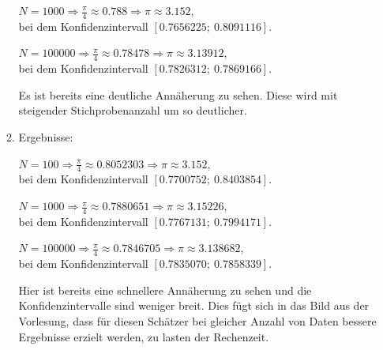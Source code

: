 \documentclass[a4paper]{scrartcl}
\def \blattnr {11}
\begin{document}
\begin{enumerate}[label=\bfseries \blattnr.\arabic*]
\begin{enumerate}
         $N = 1000 \Rightarrow \frac\pi4 \approx \num{0.788} \Rightarrow \pi \approx \num{3.152}$, \\
         bei dem Konfidenzintervall $[\num{0.7656225} ;\ \num{0.8091116}]$.

         $N = \num{100000} \Rightarrow \frac\pi4 \approx \num{0.78478} \Rightarrow \pi \approx \num{3.13912}$, \\
         bei dem Konfidenzintervall $[\num{0.7826312} ;\ \num{0.7869166}]$.

         Es ist bereits eine deutliche Annäherung zu sehen. Diese wird mit steigender 
         Stichprobenanzahl um so deutlicher.
     \pagebreak
     \item %
     

         Ergebnisse:

         $N = 100 \Rightarrow \frac\pi4 \approx \num{0.8052303} \Rightarrow \pi \approx \num{3.152}$, \\
         bei dem Konfidenzintervall $[\num{0.7700752} ;\ \num{0.8403854}]$.

         $N = 1000 \Rightarrow \frac\pi4 \approx \num{0.7880651} \Rightarrow \pi \approx \num{3.15226}$, \\
         bei dem Konfidenzintervall $[\num{0.7767131} ;\ \num{0.7994171}]$.

         $N = \num{100000} \Rightarrow \frac\pi4 \approx \num{0.7846705} \Rightarrow \pi \approx \num{3.138682}$, \\
         bei dem Konfidenzintervall $[\num{0.7835070} ;\ \num{0.7858339}]$.

         Hier ist bereits eine schnellere Annäherung zu sehen und die Konfidenzintervalle 
         sind weniger breit. Dies fügt sich in das Bild aus der Vorlesung, dass für diesen 
         Schätzer bei gleicher Anzahl von Daten bessere Ergebnisse erzielt werden, zu lasten 
         der Rechenzeit.
    \end{enumerate}


\end{enumerate}
\end{document}
